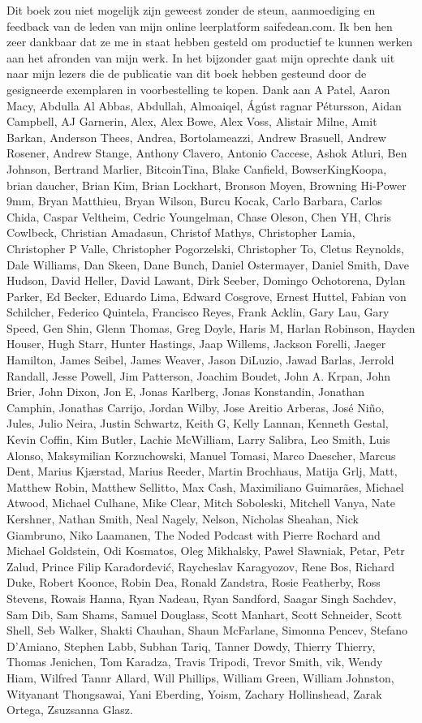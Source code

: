 Dit boek zou niet mogelijk zijn geweest zonder de steun, aanmoediging en feedback van de leden van mijn online leerplatform saifedean.com. Ik ben hen zeer dankbaar dat ze me in staat hebben gesteld om productief te kunnen werken aan het afronden van mijn werk. In het bijzonder gaat mijn oprechte dank uit naar mijn lezers die de publicatie van dit boek hebben gesteund door de gesigneerde exemplaren in voorbestelling te kopen. Dank aan A Patel, Aaron Macy, Abdulla Al Abbas, Abdullah, Almoaiqel, Ágúst ragnar Pétursson, Aidan Campbell, AJ Garnerin, Alex, Alex Bowe, Alex Voss, Alistair Milne, Amit Barkan, Anderson Thees, Andrea, Bortolameazzi, Andrew Brasuell, Andrew Rosener, Andrew Stange, Anthony Clavero, Antonio Caccese, Ashok Atluri, Ben Johnson, Bertrand Marlier, BitcoinTina, Blake Canfield, BowserKingKoopa, brian daucher, Brian Kim, Brian Lockhart, Bronson Moyen, Browning Hi-Power 9mm, Bryan Matthieu, Bryan Wilson, Burcu Kocak, Carlo Barbara, Carlos Chida, Caspar Veltheim, Cedric Youngelman, Chase Oleson, Chen YH, Chris Cowlbeck, Christian Amadasun, Christof Mathys, Christopher Lamia, Christopher P Valle, Christopher Pogorzelski, Christopher To, Cletus Reynolds, Dale Williams, Dan Skeen, Dane Bunch, Daniel Ostermayer, Daniel Smith, Dave Hudson, David Heller, David Lawant, Dirk Seeber, Domingo Ochotorena, Dylan Parker, Ed Becker, Eduardo Lima, Edward Cosgrove, Ernest Huttel, Fabian von Schilcher, Federico Quintela, Francisco Reyes, Frank Acklin, Gary Lau, Gary Speed, Gen Shin, Glenn Thomas, Greg Doyle, Haris M, Harlan Robinson, Hayden Houser, Hugh Starr, Hunter Hastings, Jaap Willems, Jackson Forelli, Jaeger Hamilton, James Seibel, James Weaver, Jason DiLuzio, Jawad Barlas, Jerrold Randall, Jesse Powell, Jim Patterson, Joachim Boudet, John A. Krpan, John Brier, John Dixon, Jon E, Jonas Karlberg, Jonas Konstandin, Jonathan Camphin, Jonathas Carrijo, Jordan Wilby, Jose Areitio Arberas, José Niño, Jules, Julio Neira, Justin Schwartz, Keith G, Kelly Lannan, Kenneth Gestal, Kevin Coffin, Kim Butler, Lachie McWilliam, Larry Salibra, Leo Smith, Luis Alonso, Maksymilian Korzuchowski, Manuel Tomasi, Marco Daescher, Marcus Dent, Marius Kjærstad, Marius Reeder, Martin Brochhaus, Matija Grlj, Matt, Matthew Robin, Matthew Sellitto, Max Cash, Maximiliano Guimarães, Michael Atwood, Michael Culhane, Mike Clear, Mitch Soboleski, Mitchell Vanya, Nate Kershner, Nathan Smith, Neal Nagely, Nelson, Nicholas Sheahan, Nick Giambruno, Niko Laamanen, The Noded Podcast with Pierre Rochard and Michael Goldstein, Odi Kosmatos, Oleg Mikhalsky, Paweł Sławniak, Petar, Petr Zalud, Prince Filip Karađorđević, Raycheslav Karagyozov, Rene Bos, Richard Duke, Robert Koonce, Robin Dea, Ronald Zandstra, Rosie Featherby, Ross Stevens, Rowais Hanna, Ryan Nadeau, Ryan Sandford, Saagar Singh Sachdev, Sam Dib, Sam Shams, Samuel Douglass, Scott Manhart, Scott Schneider, Scott Shell, Seb Walker, Shakti Chauhan, Shaun McFarlane, Simonna Pencev, Stefano D’Amiano, Stephen Labb, Subhan Tariq, Tanner Dowdy, Thierry Thierry, Thomas Jenichen, Tom Karadza, Travis Tripodi, Trevor Smith, vik, Wendy Hiam, Wilfred Tannr Allard, Will Phillips, William Green, William Johnston, Wityanant Thongsawai, Yani Eberding, Yoism, Zachary Hollinshead, Zarak Ortega, Zsuzsanna Glasz.
